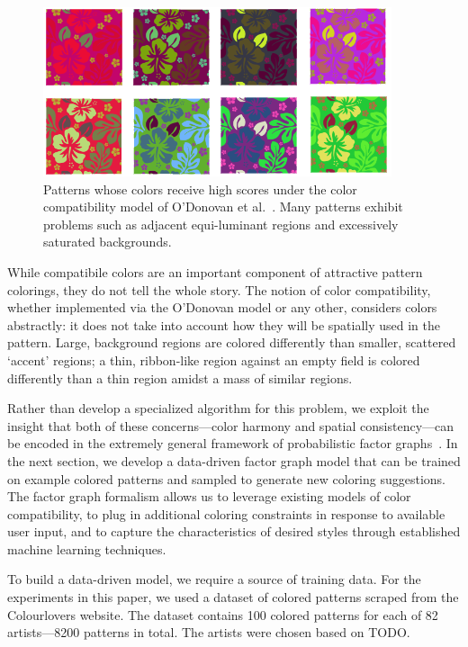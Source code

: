 \begin{figure}
\centering
\includegraphics[width=\columnwidth]{figs/colorCompatOnly}
\caption{Patterns whose colors receive high scores under the color compatibility model of O'Donovan et al.~. Many patterns exhibit problems such as adjacent equi-luminant regions and excessively saturated backgrounds.~}
\label{fig:ColorCompatOnly}
\end{figure}

While compatibile colors are an important component of attractive pattern colorings, they do not tell the whole story. The notion of color compatibility, whether implemented via the O'Donovan model or any other, considers colors abstractly: it does not take into account how they will be spatially used in the pattern. Large, background regions are colored differently than smaller, scattered `accent' regions; a thin, ribbon-like region against an empty field is colored differently than a thin region amidst a mass of similar regions.

Rather than develop a specialized algorithm for this problem, we exploit the insight that both of these concerns---color harmony and spatial consistency---can be encoded in the extremely general framework of probabilistic factor graphs~\cite{FactorGraphs}. In the next section, we develop a data-driven factor graph model that can be trained on example colored patterns and sampled to generate new coloring suggestions. The factor graph formalism allows us to leverage existing models of color compatibility, to plug in additional coloring constraints in response to available user input, and to capture the characteristics of desired styles through established machine learning techniques.

To build a data-driven model, we require a source of training data. For the experiments in this paper, we used a dataset of colored patterns scraped from the Colourlovers website. The dataset contains 100 colored patterns for each of 82 artists---8200 patterns in total. The artists were chosen based on TODO.~